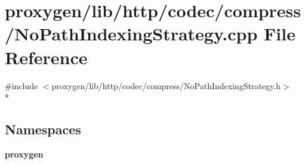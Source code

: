 \section{proxygen/lib/http/codec/compress/\+No\+Path\+Indexing\+Strategy.cpp File Reference}
\label{NoPathIndexingStrategy_8cpp}
{\ttfamily \#include $<$proxygen/lib/http/codec/compress/\+No\+Path\+Indexing\+Strategy.\+h$>$}\\*
\subsection*{Namespaces}
\begin{DoxyCompactItemize}
\item 
 {\bf proxygen}
\end{DoxyCompactItemize}
